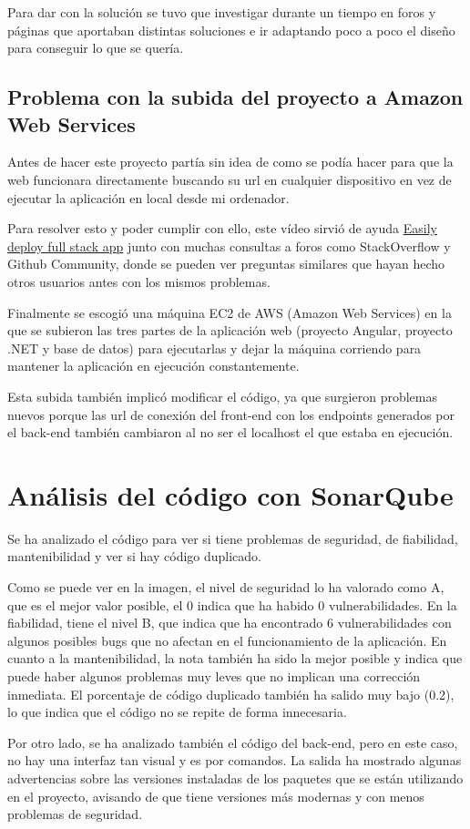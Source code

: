 Para dar con la solución se tuvo que investigar durante un tiempo en foros y páginas que aportaban distintas soluciones e ir adaptando poco a poco el diseño para conseguir lo que se quería.

\subsection{Problema con la subida del proyecto a Amazon Web Services}

Antes de hacer este proyecto partía sin idea de como se podía hacer para que la web funcionara directamente buscando su url en cualquier dispositivo en vez de ejecutar la aplicación en local desde mi ordenador.

Para resolver esto y poder cumplir con ello, este vídeo sirvió de ayuda \href{https://www.youtube.com/watch?v=nQdyiK7-VlQ}{Easily deploy full stack app} junto con muchas consultas a foros como StackOverflow y Github Community, donde se pueden ver preguntas similares que hayan hecho otros usuarios antes con los mismos problemas.

Finalmente se escogió una máquina EC2 de AWS (Amazon Web Services) en la que se subieron las tres partes de la aplicación web (proyecto Angular, proyecto .NET y base de datos) para ejecutarlas y dejar la máquina corriendo para mantener la aplicación en ejecución constantemente.

Esta subida también implicó modificar el código, ya que surgieron problemas nuevos porque las url de conexión del front-end con los endpoints generados por el back-end también cambiaron al no ser el localhost el que estaba en ejecución.


\section{Análisis del código con SonarQube}

Se ha analizado el código para ver si tiene problemas de seguridad, de fiabilidad, mantenibilidad y ver si hay código duplicado.

Como se puede ver en la imagen, el nivel de seguridad lo ha valorado como A, que es el mejor valor posible, el 0 indica que ha habido 0 vulnerabilidades. En la fiabilidad, tiene el nivel B, que indica que ha encontrado 6 vulnerabilidades con algunos posibles bugs que no afectan en el funcionamiento de la aplicación. En cuanto a la mantenibilidad, la nota también ha sido la mejor posible y indica que puede haber algunos problemas muy leves que no implican una corrección inmediata. El porcentaje de código duplicado también ha salido muy bajo (0.2), lo que indica que el código no se repite de forma innecesaria.

Por otro lado, se ha analizado también el código del back-end, pero en este caso, no hay una interfaz tan visual y es por comandos. La salida ha mostrado algunas advertencias sobre las versiones instaladas de los paquetes que se están utilizando en el proyecto, avisando de que tiene versiones más modernas y con menos problemas de seguridad.

